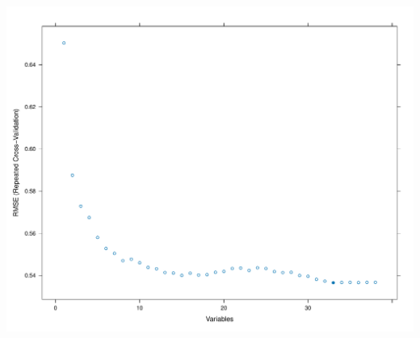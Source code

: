 \documentclass[
  letterpaper,
  DIV=11,
  numbers=noendperiod]{scrreprt}
\begin{document}
\includegraphics{02_rfe_files/figure-pdf/rfe-results-boxplot-lr-2.pdf}
\end{document}
